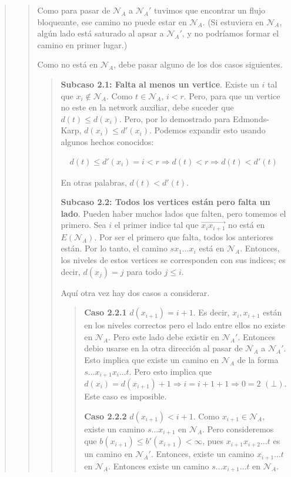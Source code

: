 \documentclass[a4paper]{article}
\begin{document}
\begin{quote}
\begin{quote}
Como para pasar de $\mathcal{N}_A$ a $\mathcal{N}_A'$ tuvimos que encontrar un
flujo bloqueante, ese camino no puede estar en $\mathcal{N}_A$. (Si estuviera
en $\mathcal{N}_A$,  algún lado está saturado al apsar a $\mathcal{N}_A'$, y no
podríamos formar el camino en primer lugar.)

Como no está en $\mathcal{N}_A$, debe pasar alguno de los dos casos siguientes. 


\small
\begin{quote}

\textbf{Subcaso 2.1: Falta al menos un vertice}. Existe un $i$ tal que $x_i
\not\in \mathcal{N}_A$. Como $t \in \mathcal{N}_A$, $i < r$. Pero, para que 
un vertice no este en la network auxiliar, debe suceder que $d(t) \leq d(x_i)$. Pero, 
por lo demostrado para Edmonds-Karp, $d(x_i) \leq d'(x_i)$. Podemos expandir esto 
usando algunos hechos conocidos: 

\begin{align*}
    d(t) \leq d'(x_i) = i < r \Rightarrow d(t) < r \Rightarrow d(t) < d'(t)
\end{align*}

En otras palabras, $d(t) < d'(t)$.

\textbf{Subcaso 2.2: Todos los vertices están pero falta un lado}. Pueden haber
muchos lados que falten, pero tomemos el primero. Sea $i$ el primer indice tal
que $\overrightarrow{x_i x_{i+1}}$ no está en $E(\mathcal{N}_A)$. Por ser el
primero que falta, todos los anteriores están. Por lo tanto, el camino $s x_1
\ldots x_i$ está en $\mathcal{N}_A$. Entonces, los niveles de estos vertices se
corresponden con sus indices; es decir, $d(x_j) = j $ para todo $j \leq i$.

Aquí otra vez hay dos casos a considerar. 


\small
\begin{quote}

    \textbf{Caso 2.2.1} $d(x_{i+1}) = i + 1$. Es decir, $x_i, x_{i+1}$ están en
    los niveles correctos pero el lado entre ellos no existe en
    $\mathcal{N}_A$. Pero este lado debe existir en $\mathcal{N}_A'$. Entonces
    debio usarse en la otra dirección al pasar de $\mathcal{N}_A$ a
    $\mathcal{N}_A'$. Esto implica que existe un camino en $\mathcal{N}_A$ de
    la forma $s \ldots x_{i+1}x_i \ldots t$. Pero esto implica que $d(x_i) =
    d(x_{i+1}) + 1 \Rightarrow i = i + 1 + 1 \Rightarrow 0 = 2$ $( \bot )$.
    Este caso es imposible. 

    \textbf{Caso 2.2.2} $d(x_{i+1}) < i + 1$. Como $x_{i+1} \in \mathcal{N}_A$,
    existe un camino $s \ldots x_{i+1}$ en $\mathcal{N}_A$. Pero consideremos
    que $b(x_{i+1}) \leq b'(x_{i+1}) < \infty$, pues $x_{i+1}x_{i+2} \ldots t$
    es un camino en $\mathcal{N}_A'$. Entonces, existe un camino $x_{i+1}
    \ldots t $ en $\mathcal{N}_A$. Entonces existe un camino $s \ldots x_{i+1}
    \ldots t$ en $\mathcal{N}_A$.


\end{quote}
\end{quote}
\end{quote}
\end{quote}
\end{document}

